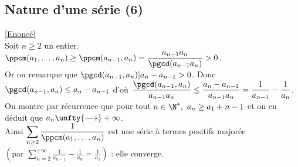 \documentclass{book}
\begin{document}
	\subsection{Nature d'une série (6) }
	\label{Nature d'une série (6) corrigé}
	\textcolor{blue}{\hyperref[Nature d'une série (6)]{[Enoncé]}}\\
	Soit $n\geq 2$ un entier.\\
	$\ppcm(a_1,\dots,a_n)\geq \ppcm(a_{n-1},a_n)=\displaystyle\frac{a_{n-1}a_n}{\pgcd(a_{n-1}a_n)}>0$.\\
	Or on remarque que $\pgcd(a_{n-1},a_n)|a_n-a_{n-1}>0$. Donc $\pgcd(a_{n-1},a_n)\leq a_n-a_{n-1}$ d'où $\displaystyle\frac{\pgcd(a_{n-1},a_n)}{a_{n-1}a_n}\leq\frac{a_n-a_{n-1}}{a_{n-1}a_n}=\frac{1}{a_{n-1}}-\frac{1}{a_n}$.\\
	On montre par récurrence que pour tout $n\in \N^*,\ a_n\geq a_1+n-1$ et on en déduit que $a_n\unfty{\longrightarrow}+\infty$.\\
	Ainsi $\displaystyle\sum\limits_{n\geq 2}\frac{1}{\ppcm(a_1,\dots,a_n)}$ est une série à termes positifs majorée $\left(\text{par }\displaystyle\sum\limits_{n=2}^{+\infty}\frac{1}{a_{n-1}}-\frac{1}{a_n}=\frac{1}{a_1}\right)$ : elle converge.
	
\end{document}
